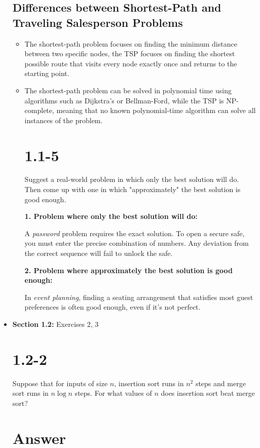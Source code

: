 \documentclass{article}
\begin{document}
\begin{itemize}
\subsection*{Differences between Shortest-Path and Traveling Salesperson Problems}
\begin{itemize}
    \item The shortest-path problem focuses on finding the minimum distance between two specific nodes, the TSP focuses on finding the shortest possible route that visits every node exactly once and returns to the starting point.
    \item The shortest-path problem can be solved in polynomial time using algorithms such as Dijkstra's or Bellman-Ford, while the TSP is NP-complete, meaning that no known polynomial-time algorithm can solve all instances of the problem.

\section*{1.1-5}

Suggest a real-world problem in which only the best solution will do. Then come up with one in which "approximately" the best solution is good enough.

\textbf{1. Problem where only the best solution will do:}

A \emph{password} problem requires the exact solution. To open a secure safe, you must enter the precise combination of numbers. Any deviation from the correct sequence will fail to unlock the safe.

\textbf{2. Problem where approximately the best solution is good enough:}

In \emph{event planning}, finding a seating arrangement that satisfies most guest preferences is often good enough, even if it's not perfect.

\end{itemize}

    \item \textbf{Section 1.2:} Exercises 2, 3
\section*{1.2-2}
Suppose that for inputs of size \(n\), insertion sort runs in \(n^2\) steps and merge sort runs in \(n \log n\) steps. For what values of \(n\) does insertion sort beat merge sort?

\section*{Answer}


\end{itemize}
\end{document}
